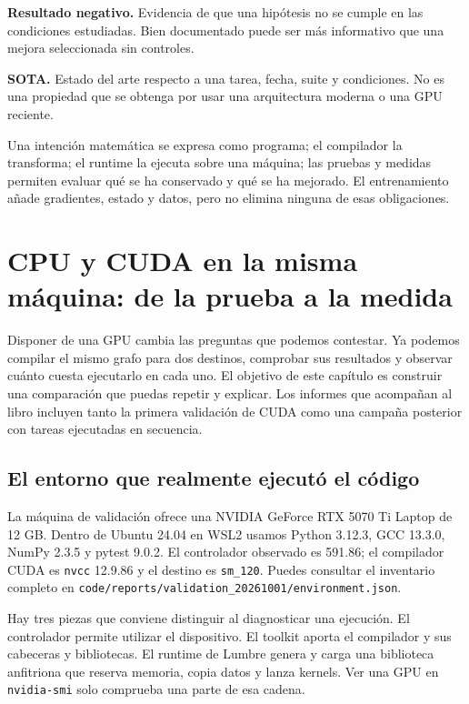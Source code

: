 \documentclass[12pt,a4paper,oneside]{report}
\begin{document}
\textbf{Resultado negativo.} Evidencia de que una hipótesis no se cumple en las condiciones estudiadas. Bien documentado puede ser más informativo que una mejora seleccionada sin controles.

\textbf{SOTA.} Estado del arte respecto a una tarea, fecha, suite y condiciones. No es una propiedad que se obtenga por usar una arquitectura moderna o una GPU reciente.

\begin{comprueba}
Una intención matemática se expresa como programa; el compilador la transforma; el runtime la ejecuta sobre una máquina; las pruebas y medidas permiten evaluar qué se ha conservado y qué se ha mejorado. El entrenamiento añade gradientes, estado y datos, pero no elimina ninguna de esas obligaciones.

\end{comprueba}

\chapter{CPU y CUDA en la misma máquina: de la prueba a la medida}
\label{ch:cpu-cuda-validacion}
Disponer de una GPU cambia las preguntas que podemos contestar. Ya podemos compilar el mismo grafo para dos destinos, comprobar sus resultados y observar cuánto cuesta ejecutarlo en cada uno. El objetivo de este capítulo es construir una comparación que puedas repetir y explicar. Los informes que acompañan al libro incluyen tanto la primera validación de CUDA como una campaña posterior con tareas ejecutadas en secuencia.

\section{El entorno que realmente ejecutó el código}
La máquina de validación ofrece una NVIDIA GeForce RTX 5070 Ti Laptop de 12 GB. Dentro de Ubuntu 24.04 en WSL2 usamos Python 3.12.3, GCC 13.3.0, NumPy 2.3.5 y pytest 9.0.2. El controlador observado es 591.86; el compilador CUDA es \texttt{nvcc} 12.9.86 y el destino es \texttt{sm\_120}. Puedes consultar el inventario completo en \texttt{code/reports\allowbreak{}/validation\_\allowbreak{}20261001/env\allowbreak{}ironment.jso\allowbreak{}n}.

Hay tres piezas que conviene distinguir al diagnosticar una ejecución. El controlador permite utilizar el dispositivo. El toolkit aporta el compilador y sus cabeceras y bibliotecas. El runtime de Lumbre genera y carga una biblioteca anfitriona que reserva memoria, copia datos y lanza kernels. Ver una GPU en \texttt{nvidia-smi} solo comprueba una parte de esa cadena.
\end{document}
